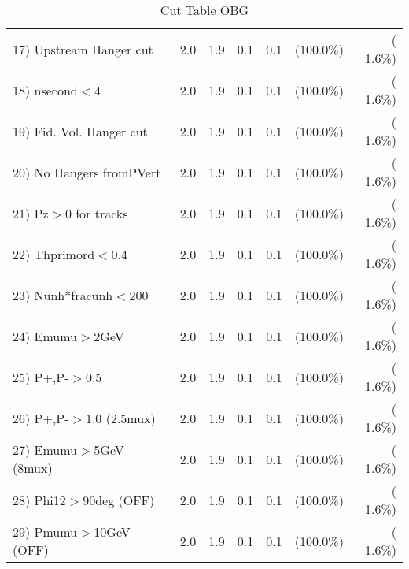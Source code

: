 \begin{table}[h!]
\begin{tabular}{||l||r|r|r|r|r|r||}
 17) Upstream Hanger cut  &          2.0 &          1.9 &          0.1 &          0.1 & (100.0\%) & (  1.6\%) \\
 18) nsecond$<$4          &          2.0 &          1.9 &          0.1 &          0.1 & (100.0\%) & (  1.6\%) \\
 19) Fid. Vol. Hanger cut &          2.0 &          1.9 &          0.1 &          0.1 & (100.0\%) & (  1.6\%) \\
 20) No Hangers fromPVert &          2.0 &          1.9 &          0.1 &          0.1 & (100.0\%) & (  1.6\%) \\
 21) Pz$>$0 for tracks    &          2.0 &          1.9 &          0.1 &          0.1 & (100.0\%) & (  1.6\%) \\
 22) Thprimord$<$0.4      &          2.0 &          1.9 &          0.1 &          0.1 & (100.0\%) & (  1.6\%) \\
 23) Nunh*fracunh$<$200   &          2.0 &          1.9 &          0.1 &          0.1 & (100.0\%) & (  1.6\%) \\
 24) Emumu$>$2GeV         &          2.0 &          1.9 &          0.1 &          0.1 & (100.0\%) & (  1.6\%) \\
 25) P+,P-$>$0.5          &          2.0 &          1.9 &          0.1 &          0.1 & (100.0\%) & (  1.6\%) \\
 26) P+,P-$>$1.0 (2.5mux) &          2.0 &          1.9 &          0.1 &          0.1 & (100.0\%) & (  1.6\%) \\
 27) Emumu$>$5GeV  (8mux) &          2.0 &          1.9 &          0.1 &          0.1 & (100.0\%) & (  1.6\%) \\
 28) Phi12$>$90deg  (OFF) &          2.0 &          1.9 &          0.1 &          0.1 & (100.0\%) & (  1.6\%) \\
 29) Pmumu$>$10GeV  (OFF) &          2.0 &          1.9 &          0.1 &          0.1 & (100.0\%) & (  1.6\%) \\
 \hline
 \hline
 \end{tabular}
 \caption{Cut Table  OBG      }
 \label{tab-cutcohjpsi-mumu_qe}
 \end{table}
